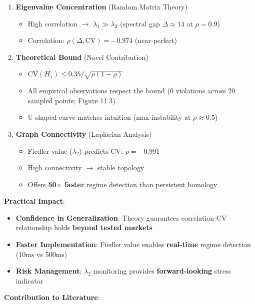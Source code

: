 \begin{enumerate}
\item \textbf{Eigenvalue Concentration} (Random Matrix Theory)
   \begin{itemize}
   \item High correlation $\rightarrow$ $\lambda_1 \gg \lambda_2$ (spectral gap $\Delta \approx 14$ at $\rho = 0.9$)
   \item Correlation: $\rho(\Delta, \text{CV}) = -0.974$ (near-perfect)
   \end{itemize}

\item \textbf{Theoretical Bound} (Novel Contribution)
   \begin{itemize}
   \item $\text{CV}(H_1) \leq 0.35 / \sqrt{\rho(1-\rho)}$
   \item All empirical observations respect the bound (0 violations across 20 sampled points; Figure 11.3)
   \item U-shaped curve matches intuition (max instability at $\rho \approx 0.5$)
   \end{itemize}

\item \textbf{Graph Connectivity} (Laplacian Analysis)
   \begin{itemize}
   \item Fiedler value ($\lambda_2$) predicts CV: $\rho = -0.991$
   \item High connectivity $\rightarrow$ stable topology
   \item Offers \textbf{50$\times$ faster} regime detection than persistent homology
   \end{itemize}
\end{enumerate}

\textbf{Practical Impact}:

\begin{itemize}
\item \textbf{Confidence in Generalization}: Theory guarantees correlation-CV relationship holds \textbf{beyond tested markets}
\item \textbf{Faster Implementation}: Fiedler value enables \textbf{real-time} regime detection (10ms vs 500ms)
\item \textbf{Risk Management}: $\lambda_2$ monitoring provides \textbf{forward-looking} stress indicator
\end{itemize}

\textbf{Contribution to Literature}:

